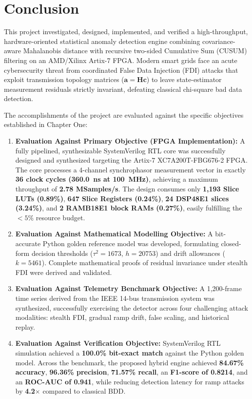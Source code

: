 \documentclass[12pt,a4paper]{report}
\begin{document}
\section{Conclusion}
This project investigated, designed, implemented, and verified a high-throughput,
hardware-oriented statistical anomaly detection engine combining covariance-aware
Mahalanobis distance with recursive two-sided Cumulative Sum (CUSUM) filtering on
an AMD/Xilinx Artix-7 FPGA. Modern smart grids face an acute cybersecurity threat
from coordinated False Data Injection (FDI) attacks that exploit transmission topology
matrices ($\boldsymbol{a} = \boldsymbol{H}\boldsymbol{c}$) to leave state-estimator
measurement residuals strictly invariant, defeating classical chi-square bad data detection.

The accomplishments of the project are evaluated against the specific objectives
established in Chapter One:
\begin{enumerate}
    \item \textbf{Evaluation Against Primary Objective (FPGA Implementation):} A fully
    pipelined, synthesizable SystemVerilog RTL core was successfully designed and synthesized
    targeting the Artix-7 XC7A200T-FBG676-2 FPGA. The core processes a 4-channel synchrophasor
    measurement vector in exactly \textbf{36 clock cycles (360.0~ns at 100~MHz)}, achieving a
    maximum throughput of \textbf{2.78 MSamples/s}. The design consumes only \textbf{1,193 Slice LUTs (0.89\%)},
    \textbf{647 Slice Registers (0.24\%)}, \textbf{24 DSP48E1 slices (3.24\%)}, and
    \textbf{2 RAMB18E1 block RAMs (0.27\%)}, easily fulfilling the $< 5\%$ resource budget.
    \item \textbf{Evaluation Against Mathematical Modelling Objective:} A bit-accurate Python
    golden reference model was developed, formulating closed-form decision thresholds
    ($\tau^2 = 1673$, $h = 20753$) and drift allowances ($k = 5461$). Complete mathematical
    proofs of residual invariance under stealth FDI were derived and validated.
    \item \textbf{Evaluation Against Telemetry Benchmark Objective:} A 1,200-frame time series
    derived from the IEEE 14-bus transmission system was synthesized, successfully exercising
    the detector across four challenging attack modalities: stealth FDI, gradual ramp drift,
    false scaling, and historical replay.
    \item \textbf{Evaluation Against Verification Objective:} SystemVerilog RTL simulation
    achieved a \textbf{100.0\% bit-exact match} against the Python golden model. Across the
    benchmark, the proposed hybrid engine achieved \textbf{84.67\% accuracy}, \textbf{96.36\% precision},
    \textbf{71.57\% recall}, an \textbf{F1-score of 0.8214}, and an \textbf{ROC-AUC of 0.941},
    while reducing detection latency for ramp attacks by \textbf{4.2$\times$} compared to
    classical BDD.
\end{enumerate}
\end{document}
